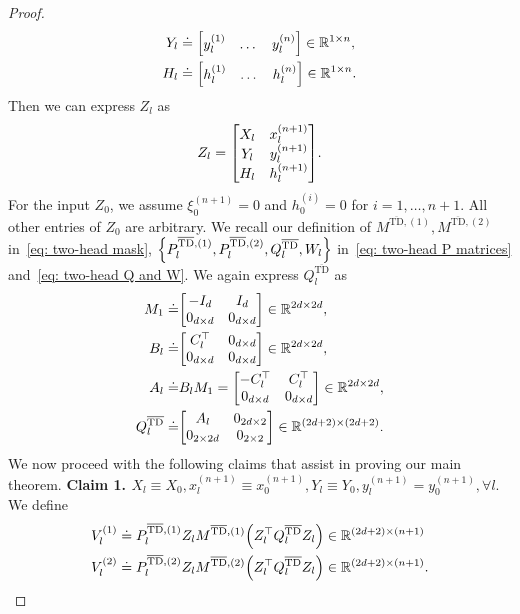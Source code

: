 \documentclass{article}
\newcommand{\R}{\mathbb{R}}
\newcommand{\bartd}{\overline{\text{TD}}}
\begin{document}
\begin{proof}
\begin{align}
        Y_l &\doteq \mqty[y_l^{(1)} & \dots & y_l^{(n)}] \in \R^{1 \times n}, \\
        H_l &\doteq \mqty[h_l^{(1)} & \dots & h_l^{(n)}] \in \R^{1 \times n}.
    \end{align}
    Then we can express $Z_l$ as
    \begin{align}
        Z_l = \mqty[X_l & x_l^{(n+1)} \\
                    Y_l & y_l^{(n+1)} \\
                    H_l & h_l^{(n+1)}].
    \end{align}
    For the input $Z_0$, we assume $\xi_0^{(n+1)} = 0$ and $h_0^{(i)} = 0$ for $i = 1, \dots, n+1$.
    All other entries of $Z_0$ are arbitrary.
    We recall our definition of $M^{\bartd, (1)}, M^{\bartd, (2)}$ in~\eqref{eq: two-head mask}, $\qty{P_l^{\bartd, (1)}, P_l^{\bartd, (2)}, Q_l^{\bartd}, W_l}$ in~\eqref{eq: two-head P matrices} and~\eqref{eq: two-head Q and W}.
    We again express $Q_l^{\bartd}$ as
    \begin{align}
      M_1 \doteq& \mqty[-I_{d} & I_{d} \\
                        0_{d \times d} & 0_{d \times d}] \in \R^{2d \times 2d}, \label{eq: two-head M_1 define}\\
      B_l \doteq& \mqty[C_l^\top & 0_{d\times d} \\
                        0_{d \times d} & 0_{d \times d}] \in \R^{2d \times 2d},\\
      A_l \doteq& B_l M_1  = \mqty[-C_l^\top & C_l^\top \\
                                   0_{d \times d} & 0_{d \times d}] \in \R^{2d \times 2d},\\
      Q_l^{\bartd} \doteq& \mqty[A_l & 0_{2d \times 2} \\
                        0_{2 \times 2d} & 0_{2\times 2}] \in \R^{(2d+2) \times (2d+2)}.
    \end{align}
    We now proceed with the following claims that assist in proving our main theorem.
    \textbf{Claim 1. $X_l \equiv X_0 , x_l^{(n+1)} \equiv x_0^{(n+1)}, Y_l \equiv Y_0, y_l^{(n+1)} = y_0^{(n+1)}, \forall l.$}
    We define
    \begin{align}
        V_l^{(1)} &\doteq P_l^{\bartd, (1)} Z_l M^{\bartd, (1)} \qty(Z_l^\top Q_l^{\bartd} Z_l) \in \R^{(2d+2)\times(n+1)}\\
        V_l^{(2)} &\doteq P_l^{\bartd, (2)} Z_l M^{\bartd, (2)} \qty(Z_l^\top Q_l^{\bartd} Z_l) \in \R^{(2d+2)\times(n+1)}.
    \end{align}

\end{proof}
\end{document}
